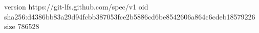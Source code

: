 version https://git-lfs.github.com/spec/v1
oid sha256:d4386bb83a29d94fcbb387053fce2b5886cd6be8542606a864c6cdeb18579226
size 786528
